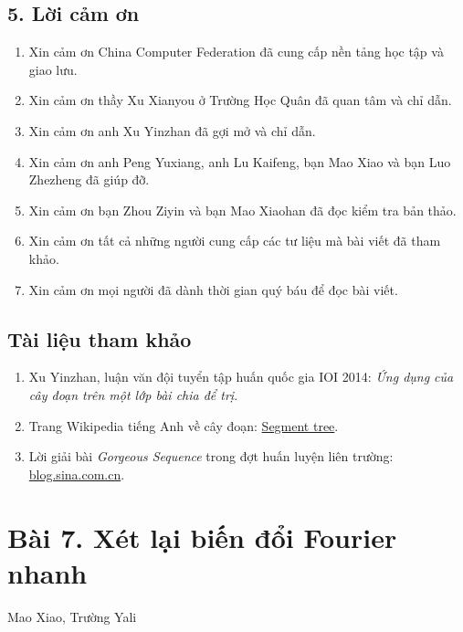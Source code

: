 \documentclass[11pt]{article}
\begin{document}
\subsection*{5. Lời cảm ơn}

\begin{enumerate}
  \item Xin cảm ơn China Computer Federation đã cung cấp nền tảng học tập và
  giao lưu.
  \item Xin cảm ơn thầy Xu Xianyou ở Trường Học Quân đã quan tâm và chỉ dẫn.
  \item Xin cảm ơn anh Xu Yinzhan đã gợi mở và chỉ dẫn.
  \item Xin cảm ơn anh Peng Yuxiang, anh Lu Kaifeng, bạn Mao Xiao và bạn Luo
  Zhezheng đã giúp đỡ.
  \item Xin cảm ơn bạn Zhou Ziyin và bạn Mao Xiaohan đã đọc kiểm tra bản thảo.
  \item Xin cảm ơn tất cả những người cung cấp các tư liệu mà bài viết đã tham
  khảo.
  \item Xin cảm ơn mọi người đã dành thời gian quý báu để đọc bài viết.
\end{enumerate}

\subsection*{Tài liệu tham khảo}

\begin{enumerate}
  \item Xu Yinzhan, luận văn đội tuyển tập huấn quốc gia IOI 2014:
  \emph{Ứng dụng của cây đoạn trên một lớp bài chia để trị}.
  \item Trang Wikipedia tiếng Anh về cây đoạn:
  \href{https://en.wikipedia.org/wiki/Segment_tree}{Segment tree}.
  \item Lời giải bài \emph{Gorgeous Sequence} trong đợt huấn luyện liên
  trường:
  \href{http://blog.sina.com.cn/s/blog_15139f11a10102vnz1.html}{blog.sina.com.cn}.
\end{enumerate}

\section*{Bài 7. Xét lại biến đổi Fourier nhanh}

\begin{center}
Mao Xiao, Trường Yali
\end{center}
\end{document}
